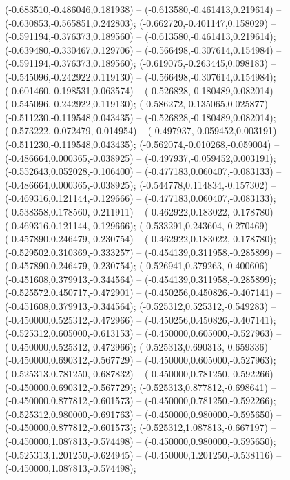  (-0.683510,-0.486046,0.181938) -- (-0.613580,-0.461413,0.219614) -- (-0.630853,-0.565851,0.242803);
 (-0.662720,-0.401147,0.158029) -- (-0.591194,-0.376373,0.189560) -- (-0.613580,-0.461413,0.219614);
 (-0.639480,-0.330467,0.129706) -- (-0.566498,-0.307614,0.154984) -- (-0.591194,-0.376373,0.189560);
 (-0.619075,-0.263445,0.098183) -- (-0.545096,-0.242922,0.119130) -- (-0.566498,-0.307614,0.154984);
 (-0.601460,-0.198531,0.063574) -- (-0.526828,-0.180489,0.082014) -- (-0.545096,-0.242922,0.119130);
 (-0.586272,-0.135065,0.025877) -- (-0.511230,-0.119548,0.043435) -- (-0.526828,-0.180489,0.082014);
 (-0.573222,-0.072479,-0.014954) -- (-0.497937,-0.059452,0.003191) -- (-0.511230,-0.119548,0.043435);
 (-0.562074,-0.010268,-0.059004) -- (-0.486664,0.000365,-0.038925) -- (-0.497937,-0.059452,0.003191);
 (-0.552643,0.052028,-0.106400) -- (-0.477183,0.060407,-0.083133) -- (-0.486664,0.000365,-0.038925);
 (-0.544778,0.114834,-0.157302) -- (-0.469316,0.121144,-0.129666) -- (-0.477183,0.060407,-0.083133);
 (-0.538358,0.178560,-0.211911) -- (-0.462922,0.183022,-0.178780) -- (-0.469316,0.121144,-0.129666);
 (-0.533291,0.243604,-0.270469) -- (-0.457890,0.246479,-0.230754) -- (-0.462922,0.183022,-0.178780);
 (-0.529502,0.310369,-0.333257) -- (-0.454139,0.311958,-0.285899) -- (-0.457890,0.246479,-0.230754);
 (-0.526941,0.379263,-0.400606) -- (-0.451608,0.379913,-0.344564) -- (-0.454139,0.311958,-0.285899);
 (-0.525572,0.450717,-0.472901) -- (-0.450256,0.450826,-0.407141) -- (-0.451608,0.379913,-0.344564);
 (-0.525312,0.525312,-0.549283) -- (-0.450000,0.525312,-0.472966) -- (-0.450256,0.450826,-0.407141);
 (-0.525312,0.605000,-0.613153) -- (-0.450000,0.605000,-0.527963) -- (-0.450000,0.525312,-0.472966);
 (-0.525313,0.690313,-0.659336) -- (-0.450000,0.690312,-0.567729) -- (-0.450000,0.605000,-0.527963);
 (-0.525313,0.781250,-0.687832) -- (-0.450000,0.781250,-0.592266) -- (-0.450000,0.690312,-0.567729);
 (-0.525313,0.877812,-0.698641) -- (-0.450000,0.877812,-0.601573) -- (-0.450000,0.781250,-0.592266);
 (-0.525312,0.980000,-0.691763) -- (-0.450000,0.980000,-0.595650) -- (-0.450000,0.877812,-0.601573);
 (-0.525312,1.087813,-0.667197) -- (-0.450000,1.087813,-0.574498) -- (-0.450000,0.980000,-0.595650);
 (-0.525313,1.201250,-0.624945) -- (-0.450000,1.201250,-0.538116) -- (-0.450000,1.087813,-0.574498);
